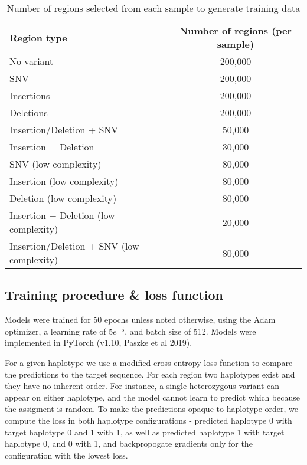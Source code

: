 \documentclass[]{article}
\begin{document}
\begin{center}
	\begin{table}
	\begin{tabular}{ lc }
	 \textbf{Region type} & \textbf{Number of regions (per sample)} \\
	 No variant & 200,000 \\
	 SNV & 200,000 \\
	 Insertions & 200,000 \\
	 Deletions & 200,000 \\
	 Insertion/Deletion + SNV & 50,000 \\
	 Insertion + Deletion & 30,000 \\
	 SNV (low complexity) & 80,000 \\
	 Insertion (low complexity) & 80,000 \\
	 Deletion (low complexity) & 80,000 \\  
	 Insertion + Deletion (low complexity) & 20,000 \\
	 Insertion/Deletion + SNV (low complexity) & 80,000 \\
	\end{tabular}
	\caption{Number of regions selected from each sample to generate training data}
	\label{table:regioncounts}
\end{table}
\end{center}

\subsection{Training procedure \& loss function}

Models were trained for 50 epochs unless noted otherwise, using the Adam optimizer, a learning rate of $5e^{-5}$, and batch size of 512. Models were implemented in PyTorch (v1.10, Paszke et al 2019).

For a given haplotype we use a modified cross-entropy loss function to compare the predictions to the target sequence. For each region two haplotypes exist and they have no inherent order. For instance, a single heterozygous variant can appear on either haplotype, and the model cannot learn to predict which because the assigment is random. To make the predictions opaque to haplotype order, we compute the loss in both haplotype configurations - predicted haplotype 0 with target haplotype 0 and 1 with 1, as well as predicted haplotype 1 with target haplotype 0, and 0 with 1, and backpropogate gradients only for the configuration with the lowest loss. 
\end{document}
